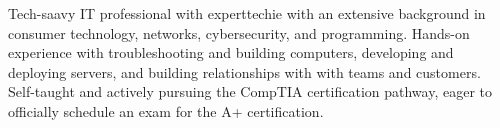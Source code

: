 
\begin{cvparagraph}
Tech-saavy IT professional with experttechie with an extensive background in consumer technology, networks, cybersecurity, and programming. Hands-on experience with troubleshooting and building computers, developing and deploying servers, and building relationships with with teams and customers. Self-taught and actively pursuing the CompTIA certification pathway, eager to officially schedule an exam for the A+ certification.

\end{cvparagraph}
